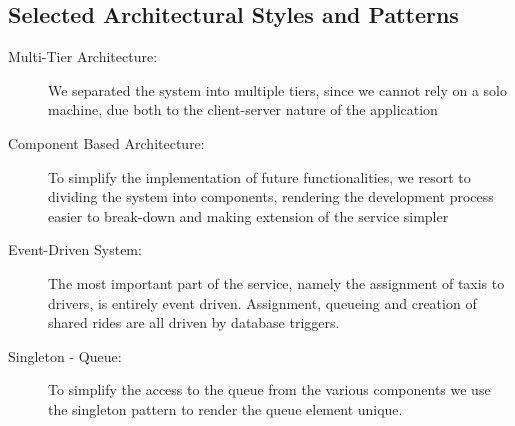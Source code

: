 \subsection{Selected Architectural Styles and Patterns}
	\begin{description}
		\item[Multi-Tier Architecture:] We separated the system into multiple tiers, since we cannot rely on a solo machine, due both to the client-server nature of the application 
		\item[Component Based Architecture:] To simplify the implementation of future functionalities, we resort to dividing the system into components,
		rendering the development process easier to break-down and making extension of the service simpler
		\item[Event-Driven System:]	The most important part of the service, namely the assignment of taxis to drivers, is entirely event driven. Assignment, queueing and creation of shared rides
		are all driven by database triggers.
		\item[Singleton - Queue:] To simplify the access to the queue from the various components we use the singleton pattern to render the queue element unique.
	\end{description}